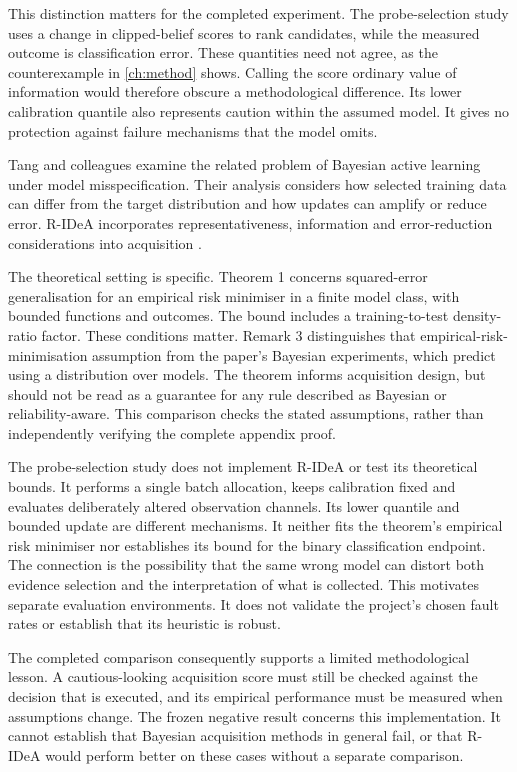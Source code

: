 This distinction matters for the completed experiment. The probe-selection study uses a change in clipped-belief scores to rank candidates, while
the measured outcome is classification error. These quantities need not agree, as the counterexample in \cref{ch:method}
shows. Calling the score ordinary value of information would therefore obscure a methodological difference. Its lower
calibration quantile also represents caution within the assumed model. It gives no protection against failure mechanisms
that the model omits.

Tang and colleagues examine the related problem of Bayesian active learning under model misspecification. Their analysis
considers how selected training data can differ from the target distribution and how updates can amplify or reduce error.
R-IDeA incorporates representativeness, information and error-reduction considerations into acquisition
\parencite[Sections 3--4]{tang2026robust}.

The theoretical setting is specific. Theorem 1 concerns squared-error generalisation for an empirical risk minimiser in a finite
model class, with bounded functions and outcomes. The bound includes a training-to-test density-ratio factor. These conditions
matter. Remark 3 distinguishes that empirical-risk-minimisation assumption from the paper's Bayesian experiments, which predict
using a distribution over models. The theorem informs acquisition design, but should not be read as a guarantee for any rule
described as Bayesian or reliability-aware. This comparison checks the stated assumptions, rather than independently verifying
the complete appendix proof.

The probe-selection study does not implement R-IDeA or test its theoretical bounds. It performs a single batch allocation, keeps calibration fixed
and evaluates deliberately altered observation channels. Its lower quantile and bounded update are different mechanisms.
It neither fits the theorem's empirical risk minimiser nor establishes its bound for the binary classification endpoint.
The connection is the possibility that the same wrong model can distort both evidence selection and the interpretation of
what is collected. This motivates separate evaluation environments. It does not validate the project's chosen fault rates
or establish that its heuristic is robust.

The completed comparison consequently supports a limited methodological lesson. A cautious-looking acquisition score must
still be checked against the decision that is executed, and its empirical performance must be measured when assumptions
change. The frozen negative result concerns this implementation. It cannot establish that Bayesian acquisition methods in
general fail, or that R-IDeA would perform better on these cases without a separate comparison.

